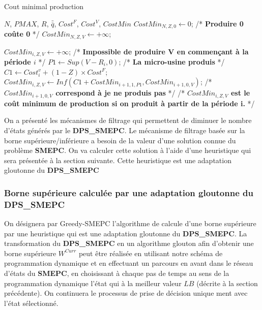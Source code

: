\begin{algorithm} 
	\caption{Cout minimal production}
	\label{ree1}
	\begin{algorithmic}[1]
		\REQUIRE $N$, $PMAX$, $R$, $\bar{\bar{q}}$, $Cost^F$, $Cost^V$,
		\ENSURE $CostMin$
		\hline
		\vspace{0.5cm} 
		\INITIALISATION
		\STATE $CostMin_{N,Z,0}  \leftarrow 0$; /* \textbf{Produire 0 coûte 0} */ 
		\STATE $CostMin_{N,Z,V}  \leftarrow  +\infty$;
		\ENDFOR
		\ENDFOR
		
		\vspace{0.3cm}
		
		\BOUCLEPRINCIPAL
		\vspace{0.2cm}
		\STATE $CostMin_{i,Z,V}  \leftarrow +\infty$; /* \textbf{Impossible de produire V en commençant à la période $i$} */
		\ELSE
		\STATE $P1 \leftarrow Sup(V-R_i,0)$; /* \textbf{La micro-usine produis} */
		\STATE $C1 \leftarrow Cost^v_i+(1-Z)\times Cost^F$; 
		\STATE  $CostMin_{i,Z,V}  \leftarrow Inf(C1+CostMin_{i+1,1,P1}, CostMin_{i+1,0,V})$; /* \textbf{$CostMin_{i+1,0,V}$ correspond à je ne produis pas} */
		/* \textbf{$CostMin_{i,Z,V}$ est le coût minimum de production si on produit à partir de la période i.} */
		\ENDIF
		\ENDFOR
		\ENDFOR
		\ENDFOR
	\end{algorithmic}
\end{algorithm}


On a présenté les mécanismes de filtrage qui permettent de diminuer le nombre d'états générés par le \textbf{DPS\_SMEPC}. Le mécanisme de filtrage basée sur la borne supérieure/inférieure a besoin de la valeur d'une solution connue du problème \textbf{SMEPC}. On va calculer cette solution à l'aide d'une heuristique qui sera présentée à la section suivante. Cette heuristique est une adaptation gloutonne du \textbf{DPS\_SMEPC}


\subsubsection{Borne supérieure calculée par une adaptation gloutonne du DPS\_SMEPC}

On désignera par Greedy-SMEPC l'algorithme de calcule d'une borne supérieure par une heuristique qui est une adaptation gloutonne du \textbf{DPS\_SMEPC}.
La transformation du \textbf{DPS\_SMEPC} en un algorithme glouton afin d'obtenir une borne supérieure $W^{Curr}$ peut être réalisée en utilisant notre schéma de programmation dynamique et en effectuant un parcours en avant dans le réseau d'états du \textbf{SMEPC}, en choisissant à chaque pas de temps au sens de la programmation dynamique l'état qui à la meilleur valeur $LB$ (décrite à la section précédente). On continuera le processus de prise de décision unique ment avec l'état sélectionné.

